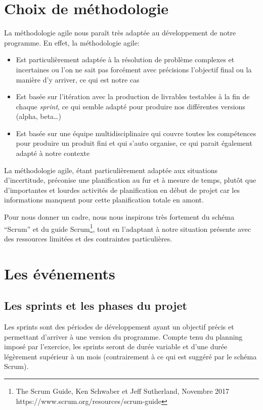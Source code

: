 \section{Choix de méthodologie}

La méthodologie agile nous paraît très adaptée au développement de notre programme.
En effet, la méthodologie agile:

\begin{itemize}
    \item  Est particulièrement adaptée à la résolution de problème complexes
          et incertaines ou l’on ne sait pas forcément avec précisions l’objectif
          final ou la manière d’y arriver, ce qui est notre cas
    \item Est basée sur l'itération avec la production de livrables testables
          à la fin de chaque \emph{sprint}, ce qui semble adapté pour produire nos différentes
          versions (alpha, beta…)
    \item Est basée sur une équipe multidisciplinaire qui couvre toutes les compétences
          pour produire un produit fini et qui s’auto organise, ce qui parait également
          adapté à notre contexte
\end{itemize}

La méthodologie agile, étant particulièrement adaptée aux situations d'incertitude, préconise
une planification au fur et à mesure de temps, plutôt que d’importantes et lourdes activités de 
planification en début de projet car les informations manquent pour cette planification totale en amont.

Pour nous donner un cadre, nous nous inspirons très fortement du schéma “Scrum” et du guide 
Scrum\footnote{The Scrum Guide, Ken Schwaber et Jeff Sutherland, Novembre 2017 https://www.scrum.org/resources/scrum-guide}, 
tout en l’adaptant à notre situation présente avec des ressources limitées et des contraintes particulières.

\section{Les événements}

\subsection{Les sprints et les phases du projet}


Les sprints sont des périodes de développement ayant un objectif précis et permettant d'arriver à une version du programme. 
Compte tenu du planning imposé par l’exercice, les sprints seront de durée variable et d'une durée légèrement supérieur à un 
mois (contrairement à ce qui est suggéré par le schéma Scrum).\\

